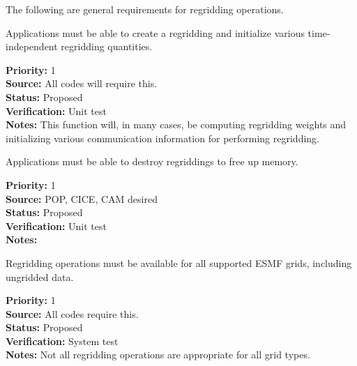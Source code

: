 

The following are general requirements for regridding operations.


Applications must be able to create a regridding and initialize
various time-independent regridding quantities.

\begin{reqlist}
{\bf Priority:} 1 \\
{\bf Source:} All codes will require this. \\
{\bf Status:} Proposed \\
{\bf Verification:} Unit test \\
{\bf Notes:} This function will, in many cases, be computing
             regridding weights and initializing various
             communication information for performing regridding.
\end{reqlist}


Applications must be able to destroy regriddings to free up memory.

\begin{reqlist}
{\bf Priority:} 1 \\
{\bf Source:} POP, CICE, CAM desired \\
{\bf Status:} Proposed \\
{\bf Verification:} Unit test \\
{\bf Notes:}  
\end{reqlist}


Regridding operations must be available for all supported ESMF grids,
including ungridded data.

\begin{reqlist}
{\bf Priority:} 1 \\
{\bf Source:} All codes require this. \\
{\bf Status:} Proposed \\
{\bf Verification:} System test \\
{\bf Notes:} Not all regridding operations are appropriate for all
             grid types.
\end{reqlist}

